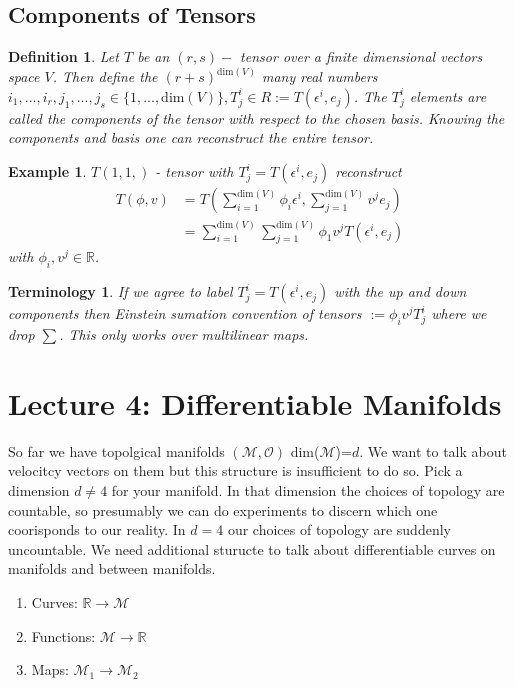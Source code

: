 \documentclass[10pt, oneside]{article}
\newcommand{\R}{\mathbb{R}}
\newcommand{\M}{\mathcal{M}}
\newtheorem{defn}{Definition}
\newtheorem{example}{Example}
\newtheorem{Terminology}{Terminology}
\begin{document}
      \subsection*{Components of Tensors}
         \begin{defn}
            Let $T$ be an $(r,s) - $ tensor over a finite dimensional vectors space $V$. Then define the $(r+s)^{\text{dim}(V)}$ many real numbers $i_1,...,i_r, j_1,...,j_s \in \{1,...,\text{dim}(V)\}, T^i_j \in R := T(\epsilon^i,e_j)$. The $T^i_j$ elements are called the components of the tensor with respect to the chosen basis.
            Knowing the components and basis one can reconstruct the entire tensor.
         \end{defn}
         \begin{example}
            $T (1,1,)$ - tensor with $T^i_j = T(\epsilon^i,e_j)$ reconstruct 
            \begin{align*}
               T(\phi,v) &= T(\sum_{i=1}^{\text{dim}(V)}\phi_i \epsilon^i, \sum_{j=1}^{\text{dim}(V)}v^j e_j) \\
               &=\sum_{i=1}^{\text{dim}(V)}\sum_{j=1}^{\text{dim}(V)} \phi_1 v^j T(\epsilon^i,e_j)
            \end{align*} 
            with $\phi_i, v^j \in \R$.
         \end{example}
         \begin{Terminology}
            If we agree to label $T^i_j = T(\epsilon^i,e_j)$ with the up and down components then Einstein sumation convention of tensors $:= \phi_i v^j T^i_j$ where we drop $\sum$. This only works over multilinear maps. 
         \end{Terminology}
\section*{Lecture 4: Differentiable Manifolds}
   So far we have topolgical manifolds $(\M,\mathcal{O})$ dim($\M$)=$d$. We want to talk about velocitcy vectors on them but this structure is insufficient to do so. 
   Pick a dimension $d \neq 4$ for your manifold. In that dimension the choices of topology are countable, so presumably we can do experiments to discern which one coorisponds to our reality. 
   In $d=4$ our choices of topology are suddenly uncountable. We need additional sturucte to talk about differentiable curves on manifolds and between manifolds. 
   \begin{enumerate}
      \item Curves: $\R \to \M$
      \item Functions: $\M \to \R$
      \item Maps: $\M_1 \to \M_2$
   \end{enumerate}
\end{document}
